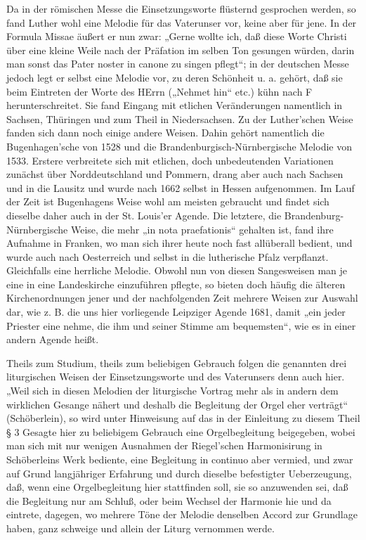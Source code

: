 Da in der römischen Messe die Einsetzungsworte flüsternd gesprochen werden, so fand Luther wohl eine Melodie für das Vaterunser vor, keine aber für jene. In der Formula Missae äußert er nun zwar: „Gerne wollte ich, daß diese Worte Christi über eine kleine Weile nach der Präfation im selben Ton gesungen würden, darin man sonst das Pater noster in canone zu singen pflegt“; in der deutschen Messe jedoch legt er selbst eine Melodie vor, zu deren Schönheit u. a. gehört, daß sie beim Eintreten der Worte des HErrn („Nehmet hin“ etc.) kühn nach F herunterschreitet. Sie fand Eingang mit etlichen Veränderungen namentlich in Sachsen, Thüringen und zum Theil in Niedersachsen. Zu der Luther’schen Weise fanden sich dann noch einige andere Weisen. Dahin gehört namentlich die Bugenhagen’sche von 1528 und die Brandenburgisch-Nürnbergische Melodie von 1533. Erstere verbreitete sich mit etlichen, doch unbedeutenden Variationen zunächst über Norddeutschland und Pommern, drang aber auch nach Sachsen und in die Lausitz und wurde nach 1662 selbst in Hessen aufgenommen. Im Lauf der Zeit ist Bugenhagens Weise wohl am meisten gebraucht und findet sich dieselbe daher auch in der St. Louis’er Agende. Die letztere, die Brandenburg-Nürnbergische Weise, die mehr „in nota praefationis“ gehalten ist, fand ihre Aufnahme in Franken, wo man sich ihrer heute noch fast allüberall bedient, und wurde auch nach Oesterreich und selbst in die lutherische Pfalz verpflanzt. Gleichfalls eine herrliche Melodie. Obwohl nun von diesen Sangesweisen man je eine in eine Landeskirche einzuführen
pflegte, so bieten doch häufig die älteren Kirchenordnungen jener und der nachfolgenden Zeit mehrere Weisen zur Auswahl dar, wie z. B. die uns hier vorliegende Leipziger Agende 1681, damit „ein jeder Priester eine nehme, die ihm und seiner Stimme am bequemsten“, wie es in einer andern Agende heißt.

Theils zum Studium, theils zum beliebigen Gebrauch folgen die genannten drei liturgischen Weisen der Einsetzungsworte und des Vaterunsers denn auch hier. „Weil sich in diesen Melodien der liturgische Vortrag mehr als in andern dem wirklichen Gesange nähert und deshalb die Begleitung der Orgel eher verträgt“ (Schöberlein), so wird unter Hinweisung auf das in der Einleitung zu diesem Theil § 3 Gesagte hier zu beliebigem Gebrauch eine Orgelbegleitung beigegeben, wobei man sich mit nur wenigen Ausnahmen der Riegel’schen Harmonisirung in Schöberleins Werk bediente, eine Begleitung in continuo aber vermied, und zwar auf Grund langjähriger Erfahrung und durch dieselbe befestigter Ueberzeugung, daß, wenn eine Orgelbegleitung hier stattfinden soll, sie so anzuwenden sei, daß die Begleitung nur am Schluß, oder beim Wechsel der Harmonie hie und da eintrete, dagegen, wo mehrere Töne der Melodie denselben Accord zur Grundlage haben, ganz schweige und allein der Liturg vernommen werde.

